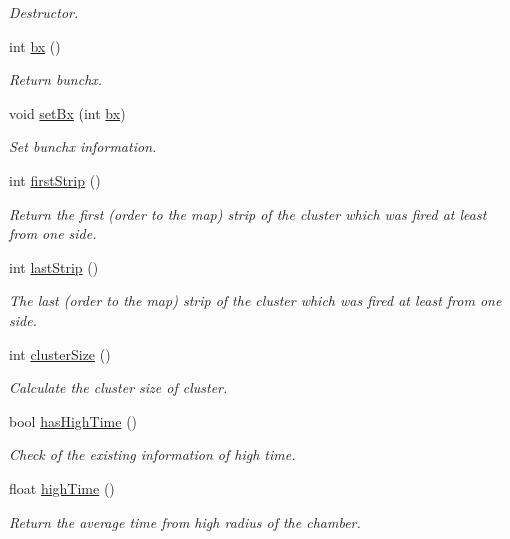 \begin{DoxyCompactItemize}
\begin{DoxyCompactList}\small\item\em Destructor. \end{DoxyCompactList}\item 
int \hyperlink{classiRPCCluster_a4834badf4c95d5b152da4dbe8f07d5fa}{bx} ()
\begin{DoxyCompactList}\small\item\em Return bunchx. \end{DoxyCompactList}\item 
void \hyperlink{classiRPCCluster_af70b6a4bdbc3b7a54942d37674ec287a}{set\-Bx} (int \hyperlink{classiRPCCluster_a4834badf4c95d5b152da4dbe8f07d5fa}{bx})
\begin{DoxyCompactList}\small\item\em Set bunchx information. \end{DoxyCompactList}\item 
int \hyperlink{classiRPCCluster_ae8b882099668a3a1e5897d76d31688a7}{first\-Strip} ()
\begin{DoxyCompactList}\small\item\em Return the first (order to the map) strip of the cluster which was fired at least from one side. \end{DoxyCompactList}\item 
int \hyperlink{classiRPCCluster_a2754db57fbc0dd00a55e1d0a08c91409}{last\-Strip} ()
\begin{DoxyCompactList}\small\item\em The last (order to the map) strip of the cluster which was fired at least from one side. \end{DoxyCompactList}\item 
int \hyperlink{classiRPCCluster_ac10aac226b3fc257e67de8926d8954f0}{cluster\-Size} ()
\begin{DoxyCompactList}\small\item\em Calculate the cluster size of cluster. \end{DoxyCompactList}\item 
bool \hyperlink{classiRPCCluster_a9c7a53ff4a4b5b4657a80250d068fa38}{has\-High\-Time} ()
\begin{DoxyCompactList}\small\item\em Check of the existing information of high time. \end{DoxyCompactList}\item 
float \hyperlink{classiRPCCluster_a73d1da17903beba8cb7d3081adc681c4}{high\-Time} ()
\begin{DoxyCompactList}\small\item\em Return the average time from high radius of the chamber. \end{DoxyCompactList}\item 

\end{DoxyCompactItemize}
